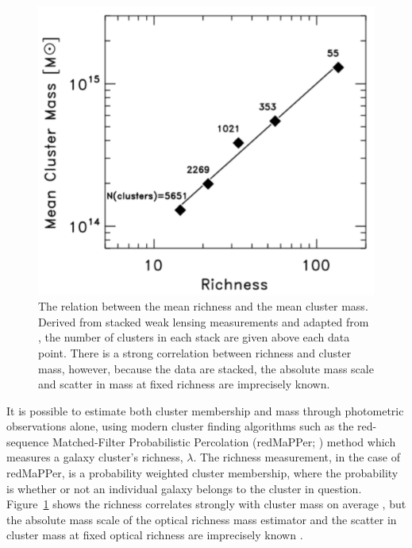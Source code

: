 \begin{figure}[!ht]
	\begin{center}
		\includegraphics[height=0.5\textheight]{figures/massrichness.pdf}
	\end{center}
	\caption[The relation between the mean richness and the mean cluster mass.]{The relation between the mean richness and the mean cluster mass. Derived from stacked weak lensing measurements and adapted from \citealt{Rozo2010}, the number of clusters in each stack are given above each data point. There is a strong correlation between richness and cluster mass, however, because the data are stacked, the absolute mass scale and scatter in mass at fixed richness are imprecisely known.}
	\label{fig:massrichness}
\end{figure}

It is possible to estimate both cluster membership and mass through photometric observations alone, using modern cluster finding algorithms such as the red-sequence Matched-Filter Probabilistic Percolation (redMaPPer; \citealt{Rykoff2014}) method which measures a galaxy cluster's richness, $\lambda$. The richness measurement, in the case of redMaPPer, is a probability weighted cluster membership, where the probability is whether or not an individual galaxy belongs to the cluster in question. Figure~\ref{fig:massrichness} shows the richness correlates strongly with cluster mass on average , but the absolute mass scale of the optical richness mass estimator and the scatter in cluster mass at fixed optical richness are imprecisely known \citep{Rykoff2012}.

